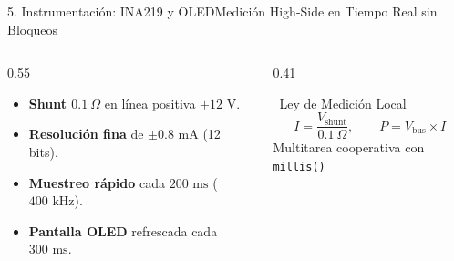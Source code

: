 \documentclass[aspectratio=169,11pt,xcolor=table]{beamer}
\begin{document}
\begin{frame}{5. Instrumentación: INA219 y OLED}{Medición High-Side en Tiempo Real sin Bloqueos}
  \vspace{0.15cm}
  \begin{columns}[c,onlytextwidth]
    \begin{column}{0.55\textwidth}
      \normalsize
      \begin{itemize}\setlength{\itemsep}{10pt}
        \item \textbf{Shunt $0.1\ \Omega$} en línea positiva $+12\text{ V}$.
        \item \textbf{Resolución fina} de $\pm 0.8\text{ mA}$ (12 bits).
        \item \textbf{Muestreo rápido} cada $200\text{ ms}$ ($400\text{ kHz}$).
        \item \textbf{Pantalla OLED} refrescada cada $300\text{ ms}$.
      \end{itemize}
    \end{column}
    \begin{column}{0.41\textwidth}
      \begin{softcard}[brandblue]{\faWaveSquare\ Ley de Medición Local}
        \centering\small
        \[
          I = \frac{V_{\text{shunt}}}{0.1\ \Omega}, \qquad P = V_{\text{bus}} \times I
        \]
        {\scriptsize\color{inkmuted}Multitarea cooperativa con \texttt{millis()}}
      \end{softcard}
    \end{column}
  \end{columns}
\end{frame}
\end{document}
